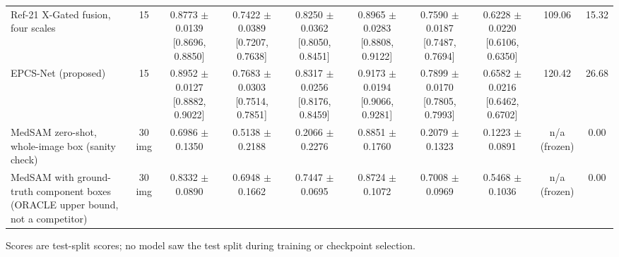 \begin{table}[H]
{\begin{tabular}{lccccccccc}
Ref-21 X-Gated fusion, four scales & 15 & 0.8773 $\pm$ 0.0139 [0.8696, 0.8850] & 0.7422 $\pm$ 0.0389 [0.7207, 0.7638] & 0.8250 $\pm$ 0.0362 [0.8050, 0.8451] & 0.8965 $\pm$ 0.0283 [0.8808, 0.9122] & 0.7590 $\pm$ 0.0187 [0.7487, 0.7694] & 0.6228 $\pm$ 0.0220 [0.6106, 0.6350] & 109.06 & 15.32 \\
EPCS-Net (proposed) & 15 & 0.8952 $\pm$ 0.0127 [0.8882, 0.9022] & 0.7683 $\pm$ 0.0303 [0.7514, 0.7851] & 0.8317 $\pm$ 0.0256 [0.8176, 0.8459] & 0.9173 $\pm$ 0.0194 [0.9066, 0.9281] & 0.7899 $\pm$ 0.0170 [0.7805, 0.7993] & 0.6582 $\pm$ 0.0216 [0.6462, 0.6702] & 120.42 & 26.68 \\
\midrule
MedSAM zero-shot, whole-image box (sanity check) & 30 img & 0.6986 $\pm$ 0.1350 & 0.5138 $\pm$ 0.2188 & 0.2066 $\pm$ 0.2276 & 0.8851 $\pm$ 0.1760 & 0.2079 $\pm$ 0.1323 & 0.1223 $\pm$ 0.0891 & n/a (frozen) & 0.00 \\
MedSAM with ground-truth component boxes (ORACLE upper bound, not a competitor) & 30 img & 0.8332 $\pm$ 0.0890 & 0.6948 $\pm$ 0.1662 & 0.7447 $\pm$ 0.0695 & 0.8724 $\pm$ 0.1072 & 0.7008 $\pm$ 0.0969 & 0.5468 $\pm$ 0.1036 & n/a (frozen) & 0.00 \\
\bottomrule
\end{tabular}}
\par\vspace{2pt}\footnotesize{Scores are test-split scores; no model saw the test split during training or checkpoint selection.}
\end{table}